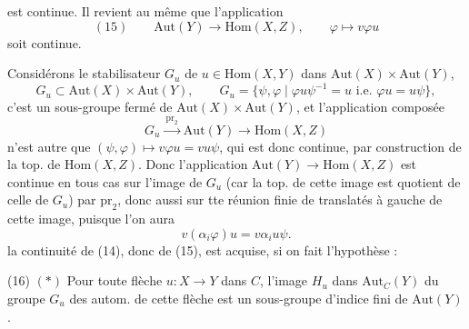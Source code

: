 \documentclass[11pt,a4paper]{article}
\begin{document}
est continue. Il revient au même que l'application
\[
  (15)\qquad \mathrm{Aut}(Y)\longrightarrow\mathrm{Hom}(X,Z),\qquad \varphi\longmapsto v\varphi u
\]
soit continue.

Considérons  le stabilisateur $G_{u}$ de $u\in\mathrm{Hom}(X,Y)$ dans $\mathrm{Aut}(X)\times\mathrm{Aut}(Y)$,
\[
  G_{u}\subset\mathrm{Aut}(X)\times\mathrm{Aut}(Y),\qquad
  G_{u}=\{\psi,\varphi \mid \varphi u\psi^{-1}=u \text{ i.e. } \varphi u=u\psi\},
\]
c'est un sous-groupe fermé de $\mathrm{Aut}(X)\times\mathrm{Aut}(Y)$, et l'application composée
\[
  G_{u}\xrightarrow{\ \mathrm{pr}_{2}\ }\mathrm{Aut}(Y)\longrightarrow\mathrm{Hom}(X,Z)
\]
n'est autre que $(\psi,\varphi)\mapsto v\varphi u=vu\psi$, qui est donc continue, par construction de la top. de $\mathrm{Hom}(X,Z)$. Donc l'application $\mathrm{Aut}(Y)\to\mathrm{Hom}(X,Z)$ est continue en tous cas sur l'image  de $G_{u}$ (car la top. de cette image est quotient de celle de $G_{u}$) par $\mathrm{pr}_{2}$, donc aussi sur tte réunion finie de translatés à gauche  de cette image, puisque l'on aura
\[
  v(\alpha_{i}\varphi)u=v\alpha_{i}u\psi .
\]
 la continuité de (14), donc de (15), est acquise, si on fait l'hypothèse :

(16) $(*)$ Pour toute flèche $u\colon X\to Y$ dans $C$, l'image $H_{u}$ dans $\mathrm{Aut}_{C}(Y)$ du groupe $G_{u}$ des autom. de cette flèche est un sous-groupe d'indice fini de $\mathrm{Aut}(Y)$.
\end{document}
